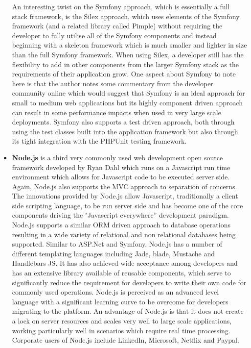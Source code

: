 \documentclass[a4paper,Times New Roman 11pt]{article}
\begin{document}
\begin{itemize}
An interesting twist on the Symfony approach, which is essentially a full stack framework, is the Silex approach, which uses elements of the Symfony framework (and a related library called Pimple) without requiring the developer to fully utilise all of the Symfony components and instead beginning with a skeleton framework which is much smaller and lighter in size than the full Symfony framework. When using Silex, a developer still has the flexibility to add in other components from the larger Symfony stack as the requirements of their application grow. One aspect about Symfony to note here is that the author notes some commentary from the developer community online which would suggest that Symfony is an ideal approach for small to medium web applications but its highly component driven approach can result in some performance impacts when used in very large scale deployments. Symfony also supports a test driven approach, both through using the test classes built into the application framework but also through its tight integration with the PHPUnit testing framework.
\item \textbf{Node.js} is a third very commonly used web development open source framework developed by Ryan Dahl which runs on a Javascript run time environment which allows for Javascript code to be executed server side. Again, Node.js also supports the MVC approach to separation of concerns. The innovations provided by Node.js allow Javascript, traditionally a client side scripting language, to be run server side and has become one of the core components driving the "Javascript everywhere'' development paradigm. Node.js supports a similar ORM driven approach to database operations resulting in a wide variety of relational and non relational databases being supported. Similar to ASP.Net and Symfony, Node.js has a number of different templating languages including Jade, blade, Mustache and Handlebars JS. It has also achieved wide acceptance among developers and has an extensive library available of reusable components, which serve to significantly reduce the requirement for developers to write their own code for commonly used operations. Node.js is perceived as an advanced level language with a significant learning curve to be overcome for developers migrating to the platform. An advantage of Node.js is that it does not create a lock on server resources and scales very well to large scale applications, working particularly well in scenarios which require real time processing. Corporate users of Node.js include LinkedIn, Microsoft, Netflix and Paypal.
\end{itemize}
\end{document}

